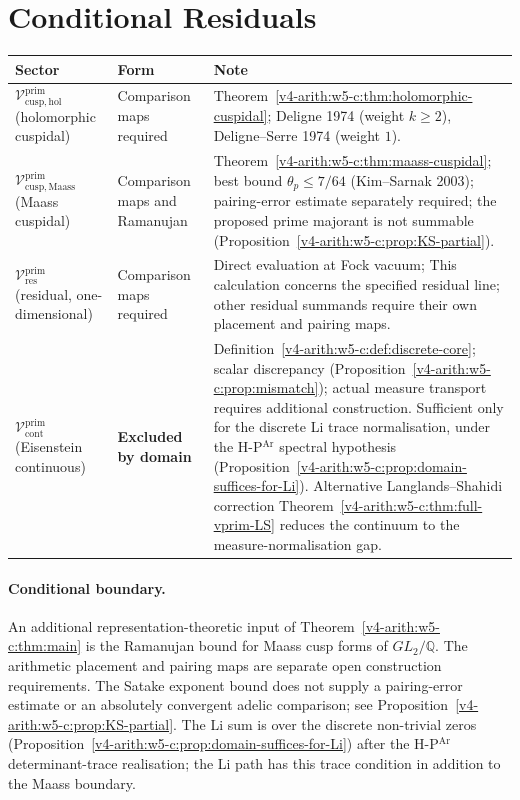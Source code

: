 \section{Conditional Residuals}
\label{v4-arith:w5-c:remaining-conditional}

\begin{center}
\small
\begin{tabular}{p{}|p{}|p{}}
Sector & Form & Note \\
\hline
\(\mathcal{V}^{\mathrm{prim}}_{\mathrm{cusp,hol}}\) (holomorphic
cuspidal) & Comparison maps required &
Theorem~\ref{v4-arith:w5-c:thm:holomorphic-cuspidal}; Deligne 1974
(weight \(k\geq 2\)), Deligne--Serre 1974 (weight \(1\)). \\
\(\mathcal{V}^{\mathrm{prim}}_{\mathrm{cusp,Maass}}\) (Maass
cuspidal) & Comparison maps and Ramanujan &
Theorem~\ref{v4-arith:w5-c:thm:maass-cuspidal}; best bound \(\theta_{p}\leq 7/64\)
(Kim--Sarnak 2003); pairing-error estimate separately required; the proposed prime
majorant is not summable (Proposition~\ref{v4-arith:w5-c:prop:KS-partial}). \\
\(\mathcal{V}^{\mathrm{prim}}_{\mathrm{res}}\) (residual,
one-dimensional) & Comparison maps required &
Direct evaluation at Fock vacuum;
This calculation concerns the specified residual line; other
residual summands require their own placement and pairing maps. \\
\(\mathcal{V}^{\mathrm{prim}}_{\mathrm{cont}}\) (Eisenstein
continuous) & \textbf{Excluded by domain} &
Definition~\ref{v4-arith:w5-c:def:discrete-core}; scalar discrepancy
(Proposition~\ref{v4-arith:w5-c:prop:mismatch}); actual measure transport
requires additional construction.
Sufficient only for the discrete Li trace normalisation, under the
H-P\(^{\mathrm{Ar}}\) spectral hypothesis
(Proposition~\ref{v4-arith:w5-c:prop:domain-suffices-for-Li}). Alternative
Langlands--Shahidi correction Theorem~\ref{v4-arith:w5-c:thm:full-vprim-LS}
reduces the continuum to the measure-normalisation gap. \\
\end{tabular}
\end{center}

\paragraph{Conditional boundary.}
An additional representation-theoretic input of
Theorem~\ref{v4-arith:w5-c:thm:main} is the Ramanujan bound for Maass cusp
forms of \(GL_{2}/\mathbb{Q}\). The arithmetic placement and pairing maps are separate open
construction requirements. The Satake exponent bound does not supply a pairing-error estimate
or an absolutely convergent adelic comparison; see
Proposition~\ref{v4-arith:w5-c:prop:KS-partial}.
The Li sum is over the discrete non-trivial zeros
(Proposition~\ref{v4-arith:w5-c:prop:domain-suffices-for-Li}) after the
H-P\(^{\mathrm{Ar}}\) determinant-trace realisation; the Li path has
this trace condition in addition to the Maass boundary.

